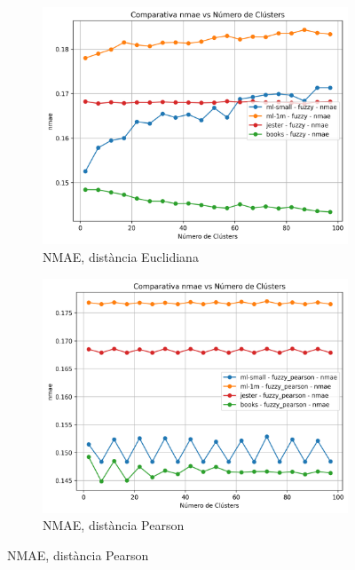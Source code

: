 \documentclass[a4paper,12pt]{report}
\begin{document}
\begin{figure}[H]
    \centering
    \begin{subfigure}[b]{0.49\textwidth}
        \includegraphics[width=\textwidth]{Figuras/nmae-fuzzy-all.png}
        \caption{NMAE, distància Euclidiana}
        \label{fig:fuzzy-clustering-results-a}
    \end{subfigure}
    \hfill
    \begin{subfigure}[b]{0.49\textwidth}
        \includegraphics[width=\textwidth]{Figuras/nmae-fuzzy_pearson-all.png}
        \caption{NMAE, distància Pearson}
        \label{fig:fuzzy-clustering-results-b}
    \end{subfigure}


\end{figure}
\end{document}
